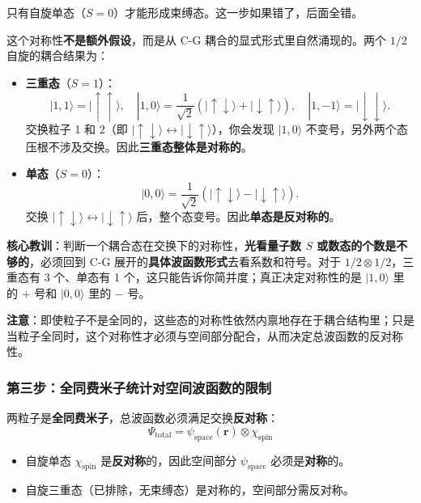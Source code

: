 \begin{insightbox}[关键判断]
只有自旋单态（$S=0$）才能形成束缚态。这一步如果错了，后面全错。
\end{insightbox}

\begin{tipbox}
这个对称性\textbf{不是额外假设}，而是从 C-G 耦合的显式形式里自然涌现的。两个 $1/2$ 自旋的耦合结果为：
\begin{itemize}[nosep]
    \item \textbf{三重态}（$S=1$）：
    \[
    |1,1\rangle = |\uparrow\uparrow\rangle, \quad |1,0\rangle = \frac{1}{\sqrt{2}}(|\uparrow\downarrow\rangle + |\downarrow\uparrow\rangle), \quad |1,-1\rangle = |\downarrow\downarrow\rangle.
    \]
    交换粒子 1 和 2（即 $|\uparrow\downarrow\rangle \leftrightarrow |\downarrow\uparrow\rangle$），你会发现 $|1,0\rangle$ 不变号，另外两个态压根不涉及交换。因此\textbf{三重态整体是对称的}。
    \item \textbf{单态}（$S=0$）：
    \[
    |0,0\rangle = \frac{1}{\sqrt{2}}(|\uparrow\downarrow\rangle - |\downarrow\uparrow\rangle).
    \]
    交换 $|\uparrow\downarrow\rangle \leftrightarrow |\downarrow\uparrow\rangle$ 后，整个态变号。因此\textbf{单态是反对称的}。
\end{itemize}
\textbf{核心教训}：判断一个耦合态在交换下的对称性，\textbf{光看量子数 $S$ 或数态的个数是不够的}，必须回到 C-G 展开的\textbf{具体波函数形式}去看系数和符号。对于 $1/2 \otimes 1/2$，三重态有 3 个、单态有 1 个，这只能告诉你简并度；真正决定对称性的是 $|1,0\rangle$ 里的 $+$ 号和 $|0,0\rangle$ 里的 $-$ 号。

\textbf{注意}：即使粒子不是全同的，这些态的对称性依然内禀地存在于耦合结构里；只是当粒子全同时，这个对称性才必须与空间部分配合，从而决定总波函数的反对称性。
\end{tipbox}

\subsubsection{第三步：全同费米子统计对空间波函数的限制}

两粒子是\textbf{全同费米子}，总波函数必须满足交换\textbf{反对称}：
\[
\Psi_{\text{total}} = \psi_{\text{space}}(\bm{r}) \otimes \chi_{\text{spin}}
\]

\begin{itemize}[nosep]
    \item 自旋单态 $\chi_{\text{spin}}$ 是\textbf{反对称}的，因此空间部分 $\psi_{\text{space}}$ 必须是\textbf{对称}的。
    \item 自旋三重态（已排除，无束缚态）是对称的，空间部分需反对称。
\end{itemize}

